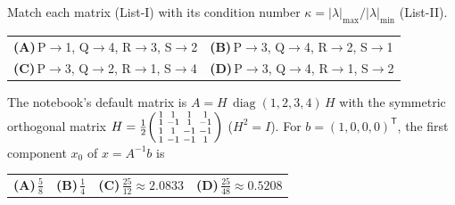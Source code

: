 \documentclass[11pt,a4paper]{article}
\newcommand{\optlabel}[1]{\textbf{(#1)}}
\newenvironment{qitem}[1]{\begin{list}{}{\setlength{\leftmargin}{3.3em}\setlength{\labelwidth}{3.1em}%
  \setlength{\labelsep}{0.2em}\setlength{\topsep}{3pt}\setlength{\parsep}{3pt}}\item[\textbf{Q.#1}\hfill]}{\end{list}}
\newcommand{\qsep}{\par\vspace{2pt}{\color{black!15}\hrule}\vspace{4pt}}
\begin{document}
\begin{qitem}{4}
Match each matrix (List-I) with its condition number $\kappa = |\lambda|_{\max}/|\lambda|_{\min}$ (List-II).
\par\smallskip{}
\par\smallskip\noindent\begin{tabularx}{\linewidth}{@{}*{2}{L}@{}}
\optlabel{A}\,P$\to$1, Q$\to$4, R$\to$3, S$\to$2 & \optlabel{B}\,P$\to$3, Q$\to$4, R$\to$2, S$\to$1 \\[3pt]
\optlabel{C}\,P$\to$3, Q$\to$2, R$\to$1, S$\to$4 & \optlabel{D}\,P$\to$3, Q$\to$4, R$\to$1, S$\to$2
\end{tabularx}
\end{qitem}
\qsep

\begin{qitem}{5}
The notebook's default matrix is $A = H\,\operatorname{diag}(1, 2, 3, 4)\,H$ with the symmetric orthogonal matrix
$H = \tfrac12\begin{psmallmatrix}1&1&1&1\\1&-1&1&-1\\1&1&-1&-1\\1&-1&-1&1\end{psmallmatrix}$ ($H^2 = I$). For $b = (1, 0, 0, 0)^{\mathsf T}$, the first component $x_0$ of $x = A^{-1}b$ is
\par\smallskip\noindent\begin{tabularx}{\linewidth}{@{}*{4}{L}@{}}
\optlabel{A}\,$\tfrac{5}{8}$ & \optlabel{B}\,$\tfrac14$ & \optlabel{C}\,$\tfrac{25}{12} \approx 2.0833$ & \optlabel{D}\,$\tfrac{25}{48} \approx 0.5208$
\end{tabularx}
\end{qitem}
\qsep
\end{document}
